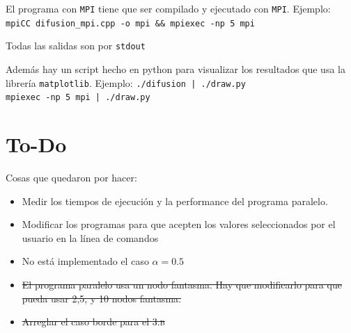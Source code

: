\documentclass[12pt, a4paper]{article}
\begin{document}
			El programa con \texttt{MPI} tiene que ser compilado y ejecutado con \texttt{MPI}.
			Ejemplo: \texttt{mpiCC difusion\_mpi.cpp -o mpi \&\& mpiexec -np 5 mpi}
			
			Todas las salidas son por \texttt{stdout}
			
			Además hay un script hecho en python para visualizar los resultados que usa la librería \texttt{matplotlib}.
			Ejemplo: \texttt{./difusion | ./draw.py}\\
			\texttt{mpiexec -np 5 mpi | ./draw.py}
		
		\section{To-Do}
			Cosas que quedaron por hacer:
			\begin{itemize}
				\item Medir los tiempos de ejecución y la performance del programa paralelo.
				\item Modificar los programas para que acepten los valores seleccionados por el usuario en la línea de comandos
				\item No está implementado el caso $\alpha=0.5$
				\item \sout{El programa paralelo usa un nodo fantasma. Hay que modificarlo para que pueda usar 2,5, y 10 nodos fantasma.}
				\item \sout{Arreglar el caso borde para el \textsc{3.b}}
			\end{itemize}
\end{document}
